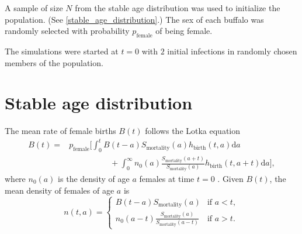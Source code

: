 \documentclass[12pt]{article}
\newcommand{\md}{\mathrm{d}}
\begin{document}
A sample of size $N$ from the stable age distribution was used to
initialize the population.  (See \autoref{stable_age_distribution}.)
The sex of each buffalo was randomly selected with probability
$p_{\text{female}}$ of being female.

The simulations were started at $t = 0$ with $2$ initial infections
in randomly chosen members of the population.

\cite{hedger_1972}

\cite{medlock_2020}


\section{Stable age distribution}
\label{stable_age_distribution}

The mean rate of female births $B(t)$ follows the Lotka equation
\begin{equation}
  \label{lotka}
  \begin{split}
    B(t) =&
    p_{\text{female}} \bigg[
      \int_0^t B(t - a)
      S_{\text{mortality}}(a)
      h_{\text{birth}}(t, a) \md a
    \\
    & \quad\quad\quad\quad\quad {} +
      \int_0^{\infty} n_0(a)
      \frac{S_{\text{mortality}}(a + t)}{S_{\text{mortality}}(a)}
      h_{\text{birth}}(t, a + t) \md a
    \bigg],
  \end{split}
\end{equation}
where $n_0(a)$ is the density of age $a$ females at time $t = 0$
\autocite{harris_1963, kot_01}.
Given $B(t)$, the mean density of females of age $a$ is
\begin{equation}
  n(t, a) =
  \begin{cases}
    B(t - a) S_{\text{mortality}}(a)
    & \text{if $a < t$},
    \\
    n_0(a - t)
    \frac{S_{\text{mortality}}(a)}{S_{\text{mortality}}(a - t)}
    & \text{if $a > t$}.
  \end{cases}
\end{equation}
\end{document}
